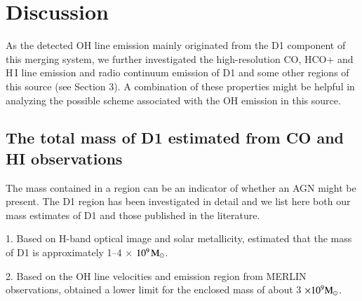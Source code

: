 \documentclass[]{aa} %
\newcommand{\HI}{{\rm H\,{\scriptsize I}}\xspace}
\begin{document}







\section{Discussion}{\label{sec:discussion}}
 As the detected OH line emission mainly originated from the D1 component of this merging system, we further investigated the high-resolution CO, HCO+ and \HI line emission and radio continuum emission of D1 and some other regions of this source (see Section 3). A combination of these properties might be helpful in analyzing the possible scheme associated with the OH emission in this source.
\subsection{The total mass of D1 estimated from CO and HI observations}

The mass contained in a region can be an indicator of whether an AGN might be present. The D1 region has been investigated in detail and we list here both our mass estimates of D1 and those published in the literature.

1. Based on H-band optical image and solar metallicity, \cite{2010AJ....140...63I} estimated that the mass of D1 is approximately 1–4 $\times$ $\rm 10^{9}$$\rm M_{\odot}$.

2. Based on the OH line velocities and emission region from MERLIN observations, \cite{2011MNRAS.416.1267M} obtained a lower limit for the enclosed mass of about 3 $\rm \times10^{9}M_{\odot}$. %
\end{document}
